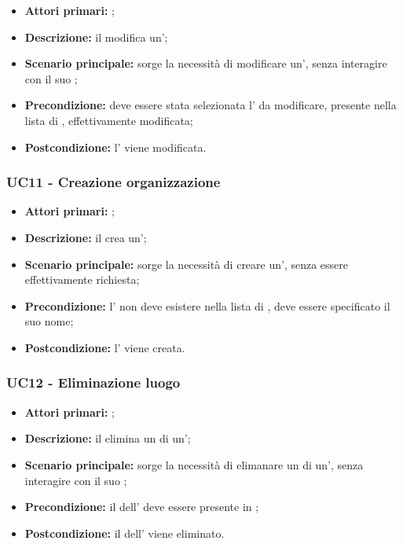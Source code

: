 \documentclass[casi-duso]{subfiles}
\begin{document}
\begin{itemize}
  \item \textbf{Attori primari:} ;
  \item \textbf{Descrizione:} il  modifica un';
  \item \textbf{Scenario principale:} sorge la necessità di modificare un', senza interagire con il suo ;
  \item \textbf{Precondizione:} deve essere stata selezionata l' da modificare, presente nella lista di , effettivamente modificata;
  \item \textbf{Postcondizione:} l' viene modificata.

\end{itemize}


\subsubsection{UC11 - Creazione organizzazione}
\label{subsub:UC11}

\begin{itemize}
  \item \textbf{Attori primari:} ;
  \item \textbf{Descrizione:} il  crea un';
  \item \textbf{Scenario principale:} sorge la necessità di creare un', senza essere effettivamente richiesta;
  \item \textbf{Precondizione:} l' non deve esistere nella lista di , deve essere specificato il suo nome;
  \item \textbf{Postcondizione:} l' viene creata.

\end{itemize}

\subsubsection{UC12 - Eliminazione luogo}
\label{subsub:UC12}

\begin{itemize}
  \item \textbf{Attori primari:} ;
  \item \textbf{Descrizione:} il  elimina un  di un';
  \item \textbf{Scenario principale:} sorge la necessità di elimanare un  di un', senza interagire con il suo ;
  \item \textbf{Precondizione:} il  dell' deve essere presente in ;
  \item \textbf{Postcondizione:} il  dell' viene eliminato.

\end{itemize}
\end{document}
